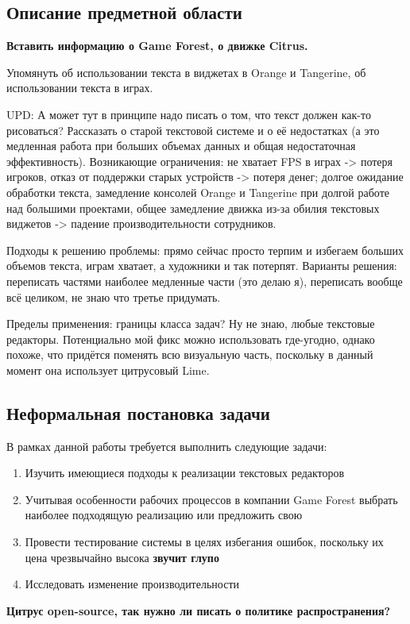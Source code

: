 \documentclass{fefu}
\begin{document}
		\subsection{Описание предметной области}
			\textbf{Вставить информацию о Game Forest, о движке Citrus.}
			\par Упомянуть об использовании текста в виджетах в Orange и Tangerine, об 
			использовании текста в играх.	
			\par UPD: А может тут в принципе надо писать о том, что текст должен как-то 
			рисоваться?
			Рассказать о старой текстовой системе и о её недостатках (а это медленная работа 
			при больших объемах данных и общая недостаточная эффективность). Возникающие 
			ограничения: не хватает FPS в играх -> потеря игроков, отказ от поддержки старых 
			устройств -> потеря денег; долгое ожидание обработки текста, замедление консолей 
			Orange и Tangerine при долгой работе над большими проектами, общее замедление 
			движка из-за обилия текстовых виджетов -> падение производительности сотрудников.	
			\par Подходы к решению проблемы: прямо сейчас просто терпим и избегаем больших 
			объемов текста, играм хватает, а художники и так потерпят. Варианты решения: 
			переписать частями наиболее медленные части (это делаю я), переписать вообще всё 
			целиком, не знаю что третье придумать.
			\par Пределы применения: границы класса задач? Ну не знаю, любые текстовые 
			редакторы. Потенциально мой фикс можно использовать где-угодно, однако похоже, 
			что придётся поменять всю визуальную часть, поскольку в данный момент она 
			использует цитрусовый Lime.		
		\subsection{Неформальная постановка задачи}
			В рамках данной работы требуется выполнить следующие задачи:
			\begin{enumerate}
				\item Изучить имеющиеся подходы к реализации текстовых редакторов
				\item Учитывая особенности рабочих процессов в компании Game Forest выбрать 
				наиболее подходящую реализацию или предложить свою
				\item Провести тестирование системы в целях избегания ошибок, поскольку их цена 
				чрезвычайно высока \textbf{звучит глупо}
				\item Исследовать изменение производительности
			\end{enumerate}
			\textbf{Цитрус open-source, так нужно ли писать о политике распространения?}
\end{document}
